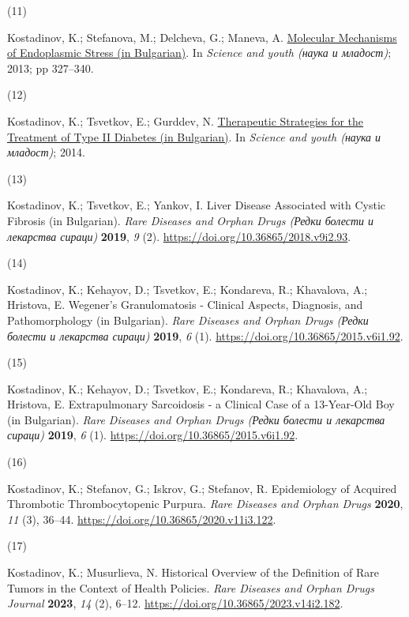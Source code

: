 \documentclass[
  12pt,
  letterpaper,
  DIV=11,
  numbers=noendperiod]{scrartcl}
\newlength{\cslhangindent}
\newlength{\csllabelwidth}
\newenvironment{CSLReferences}[2] %
 {\begin{list}{}{%
  \setlength{\itemindent}{0pt}
  \setlength{\leftmargin}{0pt}
  \setlength{\parsep}{0pt}
  \ifodd #1
   \setlength{\leftmargin}{\cslhangindent}
   \setlength{\itemindent}{-1\cslhangindent}
  \fi
  \setlength{\itemsep}{#2\baselineskip}}}
 {\end{list}}
\newcommand{\CSLLeftMargin}[1]{\parbox[t]{\csllabelwidth}{\strut#1\strut}}
\newcommand{\CSLRightInline}[1]{\parbox[t]{\linewidth - \csllabelwidth}{\strut#1\strut}}
\begin{document}
\begin{CSLReferences}{0}{0}
\CSLLeftMargin{(11) }%
\CSLRightInline{Kostadinov, K.; Stefanova, M.; Delcheva, G.; Maneva, A.
\href{https://asclepius.bg/cnm/wp-content/uploads/2022/05/mnd_2013.pdf}{Molecular
Mechanisms of Endoplasmic Stress (in Bulgarian)}. In \emph{Science and
youth (наука и младост)}; 2013; pp 327--340.}

\CSLLeftMargin{(12) }%
\CSLRightInline{Kostadinov, K.; Tsvetkov, E.; Gurddev, N.
\href{https://asclepius.bg/cnm/wp-content/uploads/2022/05/sbornik-2014.pdf}{Therapeutic
Strategies for the Treatment of Type II Diabetes (in Bulgarian)}. In
\emph{Science and youth (наука и младост)}; 2014.}

\CSLLeftMargin{(13) }%
\CSLRightInline{Kostadinov, K.; Tsvetkov, E.; Yankov, I. Liver Disease
Associated with Cystic Fibrosis (in Bulgarian). \emph{Rare Diseases and
Orphan Drugs (Редки болести и лекарства сираци)} \textbf{2019}, \emph{9}
(2). \url{https://doi.org/10.36865/2018.v9i2.93}.}

\CSLLeftMargin{(14) }%
\CSLRightInline{Kostadinov, K.; Kehayov, D.; Tsvetkov, E.; Kondareva,
R.; Khavalova, A.; Hristova, E. Wegener's Granulomatosis - Clinical
Aspects, Diagnosis, and Pathomorphology (in Bulgarian). \emph{Rare
Diseases and Orphan Drugs (Редки болести и лекарства сираци)}
\textbf{2019}, \emph{6} (1).
\url{https://doi.org/10.36865/2015.v6i1.92}.}

\CSLLeftMargin{(15) }%
\CSLRightInline{Kostadinov, K.; Kehayov, D.; Tsvetkov, E.; Kondareva,
R.; Khavalova, A.; Hristova, E. Extrapulmonary Sarcoidosis - a Clinical
Case of a 13-Year-Old Boy (in Bulgarian). \emph{Rare Diseases and Orphan
Drugs (Редки болести и лекарства сираци)} \textbf{2019}, \emph{6} (1).
\url{https://doi.org/10.36865/2015.v6i1.92}.}

\CSLLeftMargin{(16) }%
\CSLRightInline{Kostadinov, K.; Stefanov, G.; Iskrov, G.; Stefanov, R.
Epidemiology of Acquired Thrombotic Thrombocytopenic Purpura. \emph{Rare
Diseases and Orphan Drugs} \textbf{2020}, \emph{11} (3), 36--44.
\url{https://doi.org/10.36865/2020.v11i3.122}.}

\CSLLeftMargin{(17) }%
\CSLRightInline{Kostadinov, K.; Musurlieva, N. Historical Overview of
the Definition of Rare Tumors in the Context of Health Policies.
\emph{Rare Diseases and Orphan Drugs Journal} \textbf{2023}, \emph{14}
(2), 6--12. \url{https://doi.org/10.36865/2023.v14i2.182}.}


\end{CSLReferences}
\end{document}
